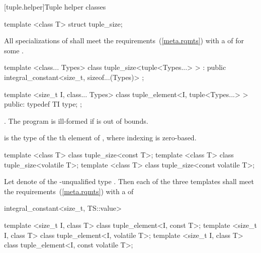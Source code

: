 [tuple.helper]{Tuple helper classes}

%
\begin{itemdecl}
template <class T> struct tuple_size;
\end{itemdecl}

\begin{itemdescr}
\remarks All specializations of  shall meet the
 requirements~(\ref{meta.rqmts}) with a
 of 
for some .
\end{itemdescr}

%
\begin{itemdecl}
template <class... Types>
class tuple_size<tuple<Types...> >
  : public integral_constant<size_t, sizeof...(Types)> { };
\end{itemdecl}

%
\begin{itemdecl}
template <size_t I, class... Types>
class tuple_element<I, tuple<Types...> > {
public:
  typedef TI type;
};
\end{itemdecl}

\begin{itemdescr}
\pnum
\requires {}.
The program is ill-formed if  is out of bounds.

\pnum
\ctype {} is the
type of the th element of ,
where indexing is zero-based.
\end{itemdescr}

\begin{itemdecl}
template <class T> class tuple_size<const T>;
template <class T> class tuple_size<volatile T>;
template <class T> class tuple_size<const volatile T>;
\end{itemdecl}

\begin{itemdescr}
\pnum
Let  denote  of the \cv-unqualified type . Then each
of the three templates shall meet the  requirements~(\ref{meta.rqmts})
with a  of
\begin{codeblock}
integral_constant<size_t, TS::value>
\end{codeblock}
\end{itemdescr}

\begin{itemdecl}
template <size_t I, class T> class tuple_element<I, const T>;
template <size_t I, class T> class tuple_element<I, volatile T>;
template <size_t I, class T> class tuple_element<I, const volatile T>;
\end{itemdecl}

